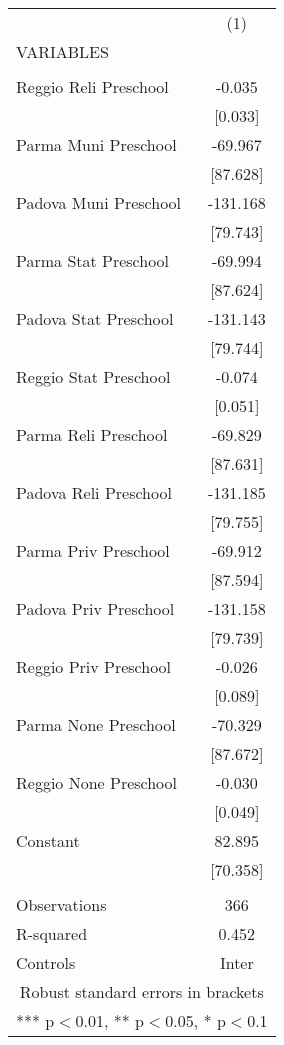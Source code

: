 \begin{tabular}{lc} \hline
 & (1) \\
VARIABLES &  \\ \hline
 &  \\
Reggio Reli Preschool & -0.035 \\
 & [0.033] \\
Parma Muni Preschool & -69.967 \\
 & [87.628] \\
Padova Muni Preschool & -131.168 \\
 & [79.743] \\
Parma Stat Preschool & -69.994 \\
 & [87.624] \\
Padova Stat Preschool & -131.143 \\
 & [79.744] \\
Reggio Stat Preschool & -0.074 \\
 & [0.051] \\
Parma Reli Preschool & -69.829 \\
 & [87.631] \\
Padova Reli Preschool & -131.185 \\
 & [79.755] \\
Parma Priv Preschool & -69.912 \\
 & [87.594] \\
Padova Priv Preschool & -131.158 \\
 & [79.739] \\
Reggio Priv Preschool & -0.026 \\
 & [0.089] \\
Parma None Preschool & -70.329 \\
 & [87.672] \\
Reggio None Preschool & -0.030 \\
 & [0.049] \\
Constant & 82.895 \\
 & [70.358] \\
 &  \\
Observations & 366 \\
R-squared & 0.452 \\
 Controls & Inter \\ \hline
\multicolumn{2}{c}{ Robust standard errors in brackets} \\
\multicolumn{2}{c}{ *** p$<$0.01, ** p$<$0.05, * p$<$0.1} \\
\end{tabular}
